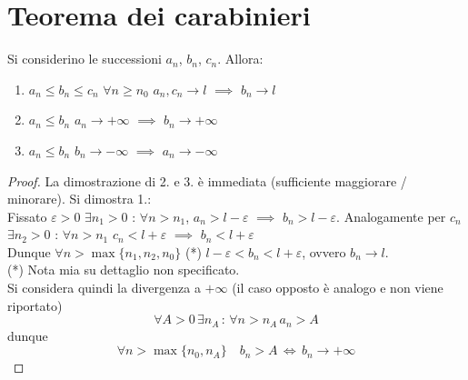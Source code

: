 \documentclass[10pt, oneside]{book}
\theoremstyle{plain}
\begin{document}
\section{Teorema dei carabinieri}
\begin{ther}
    Si considerino le successioni $a_n$, $b_n$, $c_n$. Allora:
    \begin{enumerate}
        \item $a_n \leq b_n \leq c_n$ $\forall n \geq n_0$  \qquad $a_n, c_n \rightarrow l$ $\implies$ $b_n \rightarrow l$
        \item $a_n \leq b_n$ \qquad $a_n \rightarrow +\infty$ $\implies$ $b_n \rightarrow +\infty$
        \item $a_n \leq b_n$ \qquad $b_n \rightarrow -\infty$ $\implies$ $a_n \rightarrow -\infty$
    \end{enumerate}
\end{ther}
\begin{proof}
    La dimostrazione di 2. e 3. è immediata (sufficiente maggiorare / minorare). Si dimostra 1.:
    \\Fissato $\varepsilon > 0$ $\exists n_1 > 0$ : $\forall n > n_1$, $a_n > l - \varepsilon$ $\implies$ $b_n > l - \varepsilon$. Analogamente per $c_n$ $\exists n_2 > 0$ : $\forall n > n_1$ $c_n < l + \varepsilon$ $\implies$ $b_n < l + \varepsilon$
    \\Dunque $\forall n > \max \{n_1, n_2, n_0\}$ (*) $l-\varepsilon < b_n < l + \varepsilon$, ovvero $b_n \rightarrow l$.
    \\(*) Nota mia su dettaglio non specificato.\\
    Si considera quindi la divergenza a $+\infty$ (il caso opposto è analogo e non viene riportato)
    \[\forall A > 0 \, \exists n_A \, : \, \forall n > n_A \, a_n > A\]
    dunque
    \[\forall n > \max \{n_0, n_A\} \quad b_n > A \, \Longleftrightarrow \, b_n \rightarrow +\infty\]
\end{proof}
\end{document}
